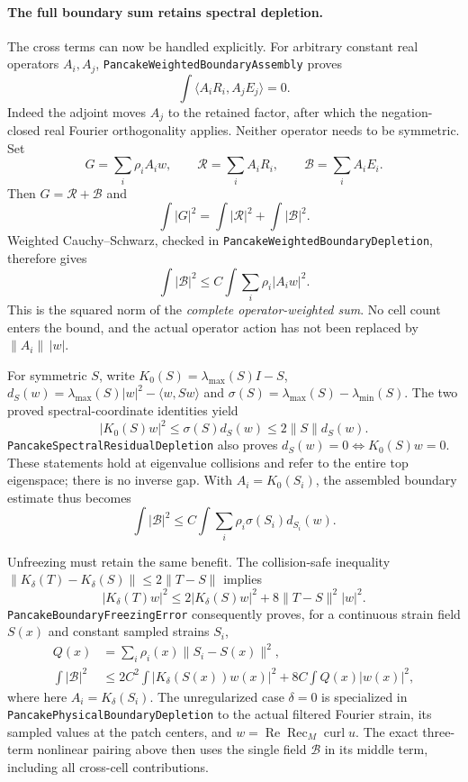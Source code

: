 \documentclass[11pt]{article}
\theoremstyle{definition}
\begin{document}
\paragraph{The full boundary sum retains spectral depletion.}
The cross terms can now be handled explicitly. For arbitrary constant real
operators $A_i,A_j$, \texttt{PancakeWeightedBoundaryAssembly} proves
\[
 \int\langle A_iR_i,A_jE_j\rangle=0.
\]
Indeed the adjoint moves $A_j$ to the retained factor, after which the
negation-closed real Fourier orthogonality applies. Neither operator needs
to be symmetric. Set
\[
 G=\sum_i\rho_i A_iw,\qquad
 \mathcal R=\sum_iA_iR_i,\qquad
 \mathcal B=\sum_iA_iE_i.
\]
Then $G=\mathcal R+\mathcal B$ and
\[
 \int|G|^2=\int|\mathcal R|^2+\int|\mathcal B|^2.
\]
Weighted Cauchy--Schwarz, checked in
\texttt{PancakeWeightedBoundaryDepletion}, therefore gives
\[
 \boxed{\quad \int|\mathcal B|^2
       \le C\int\sum_i\rho_i|A_iw|^2.\quad}
\]
This is the squared norm of the \emph{complete operator-weighted sum}.
No cell count enters the bound, and the actual operator action has not
been replaced by $\|A_i\|\,|w|$.

For symmetric $S$, write $K_0(S)=\lambda_{\max}(S)I-S$,
$d_S(w)=\lambda_{\max}(S)|w|^2-\langle w,Sw\rangle$ and
$\sigma(S)=\lambda_{\max}(S)-\lambda_{\min}(S)$.
The two proved spectral-coordinate identities yield
\[
 |K_0(S)w|^2\le\sigma(S)d_S(w)
                \le 2\|S\|d_S(w).
\]
\texttt{PancakeSpectralResidualDepletion} also proves
$d_S(w)=0\iff K_0(S)w=0$. These statements hold at eigenvalue collisions
and refer to the entire top eigenspace; there is no inverse gap. With
$A_i=K_0(S_i)$, the assembled boundary estimate thus becomes
\[
 \int|\mathcal B|^2
   \le C\int\sum_i\rho_i\sigma(S_i)d_{S_i}(w).
\]

Unfreezing must retain the same benefit. The collision-safe inequality
$\|K_\delta(T)-K_\delta(S)\|\le2\|T-S\|$ implies
\[
 |K_\delta(T)w|^2
 \le2|K_\delta(S)w|^2+8\|T-S\|^2|w|^2.
\]
\texttt{PancakeBoundaryFreezingError} consequently proves, for a continuous
strain field $S(x)$ and constant sampled strains $S_i$,
\[
 \begin{aligned}
 Q(x)&=\sum_i\rho_i(x)\|S_i-S(x)\|^2,\\
 \int|\mathcal B|^2
 &\le2C^2\int|K_\delta(S(x))w(x)|^2
       +8C\int Q(x)|w(x)|^2,
 \end{aligned}
\]
where here $A_i=K_\delta(S_i)$. The unregularized case $\delta=0$ is
specialized in \texttt{PancakePhysicalBoundaryDepletion} to the actual
filtered Fourier strain, its sampled values at the patch centers, and
$w=\operatorname{Re}\operatorname{Rec}_M\operatorname{curl}u$.
The exact three-term nonlinear pairing above then uses the single field
$\mathcal B$ in its middle term, including all cross-cell contributions.
\end{document}
